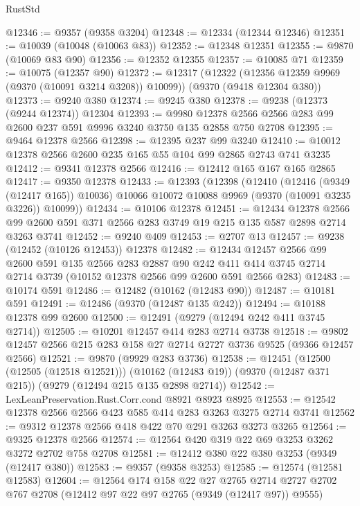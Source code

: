 \begin{lexlean}{RustStd}
\begin{coremodule}
@12346 := @9357 (@9358 @3204)
@12348 := @12334 (@12344 @12346)
@12351 := @10039 (@10048 (@10063 @83))
@12352 := @12348 @12351
@12355 := @9870 (@10069 @83 @90)
@12356 := @12352 @12355
@12357 := @10085 @71
@12359 := @10075 (@12357 @90)
@12372 := @12317
    (@12322 (@12356 @12359 @9969 (@9370 (@10091 @3214 @3208)) @10099))
    (@9370 (@9418 @12304 @380))
@12373 := @9240 @380
@12374 := @9245 @380
@12378 := @9238 (@12373 (@9244 @12374)) @12304
@12393 := @9980 @12378 @2566 @2566 @283 @99 @2600 @237 @591 @9996 @3240 @3750 @135 @2858 @750 @2708
@12395 := @9464 @12378 @2566
@12398 := @12395 @237 @99 @3240
@12410 := @10012 @12378 @2566 @2600 @235 @165 @55 @104 @99 @2865 @2743 @741 @3235
@12412 := @9341 @12378 @2566
@12416 := @12412 @165 @167 @165 @2865
@12417 := @9350 @12378
@12433 := @12393
    (@12398
      (@12410
        (@12416 (@9349 (@12417 @165)) @10036)
        @10066
        @10072
        @10088
        @9969
        (@9370 (@10091 @3235 @3226))
        @10099))
@12434 := @10106 @12378
@12451 := @12434
    @12378
    @2566
    @99
    @2600
    @591
    @371
    @2566
    @283
    @3749
    @19
    @215
    @135
    @587
    @2898
    @2714
    @3263
    @3741
@12452 := @9240 @409
@12453 := @2707 @13
@12457 := @9238 (@12452 (@10126 @12453)) @12378
@12482 := @12434
    @12457
    @2566
    @99
    @2600
    @591
    @135
    @2566
    @283
    @2887
    @90
    @242
    @411
    @414
    @3745
    @2714
    @2714
    @3739
    (@10152 @12378 @2566 @99 @2600 @591 @2566 @283)
@12483 := @10174 @591
@12486 := @12482 (@10162 (@12483 @90))
@12487 := @10181 @591
@12491 := @12486 (@9370 (@12487 @135 @242))
@12494 := @10188 @12378 @99 @2600
@12500 := @12491 (@9279 (@12494 @242 @411 @3745 @2714))
@12505 := @10201 @12457 @414 @283 @2714 @3738
@12518 := @9802 @12457 @2566 @215 @283 @158 @27 @2714 @2727 @3736 @9525 (@9366 @12457 @2566)
@12521 := @9870 (@9929 @283 @3736)
@12538 := @12451
    (@12500 (@12505 (@12518 @12521)))
    (@10162 (@12483 @19))
    (@9370 (@12487 @371 @215))
    (@9279 (@12494 @215 @135 @2898 @2714))
@12542 := LexLeanPreservation.Rust.Corr.cond @8921 @8923 @8925
@12553 := @12542 @12378 @2566 @2566 @423 @585 @414 @283 @3263 @3275 @2714 @3741
@12562 := @9312 @12378 @2566 @418 @422 @70 @291 @3263 @3273 @3265
@12564 := @9325 @12378 @2566
@12574 := @12564 @420 @319 @22 @69 @3253 @3262 @3272 @2702 @758 @2708
@12581 := @12412 @380 @22 @380 @3253 (@9349 (@12417 @380))
@12583 := @9357 (@9358 @3253)
@12585 := @12574 (@12581 @12583)
@12604 := @12564
    @174
    @158
    @22
    @27
    @2765
    @2714
    @2727
    @2702
    @767
    @2708
    (@12412 @97 @22 @97 @2765 (@9349 (@12417 @97)) @9555)

\end{coremodule}
\end{lexlean}
